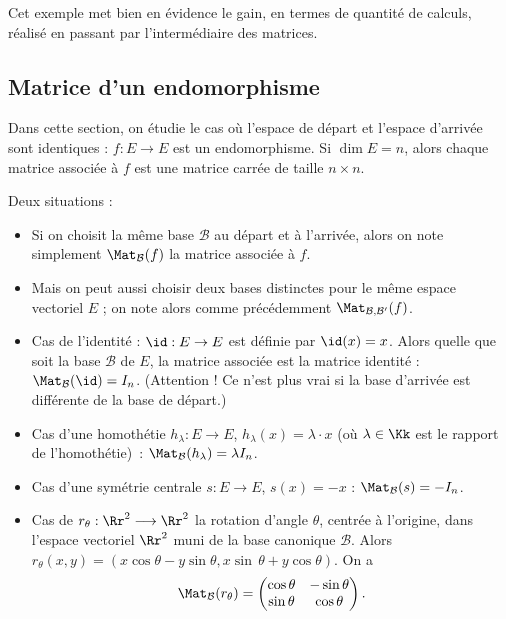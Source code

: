 \documentclass[class=report,crop=false]{standalone}
\begin{document}
\begin{exemple}
\begin{enumerate}
\end{enumerate}
Cet exemple met bien en évidence le gain, en termes de quantité de
calculs, réalisé en passant par l'intermédiaire des matrices.
\end{exemple}


\subsection{Matrice d'un endomorphisme}

Dans cette section, on étudie le cas où l'espace de départ et l'espace d'arrivée sont identiques :
$f : E \to E$ est un endomorphisme. Si $\dim E = n$, alors chaque matrice associée à $f$ est
une matrice carrée de taille $n\times n$.

Deux situations :
\begin{itemize}
  \item Si on choisit la même base $\mathcal{B}$ au départ et à l'arrivée, alors on note
  simplement $\Mat_{\mathcal{B}} (f)$ la matrice associée à $f$.

  \item Mais on peut aussi choisir deux bases distinctes pour le même espace vectoriel $E$ ; on note alors comme précédemment
  $\Mat_{\mathcal{B},\mathcal{B}'} (f)$.
\end{itemize}


\begin{exemple}
\sauteligne
\begin{itemize}
  \item Cas de l'identité : $\id : E \to E$ est définie par $\id(x)=x$.
  Alors quelle que soit la base $\mathcal{B}$ de $E$, la matrice associée est la matrice identité :
  $\Mat_{\mathcal{B}} (\id) = I_n$. (Attention ! Ce n'est plus vrai
  si la base d'arrivée est différente de la base de départ.)

  \item Cas d'une homothétie $h_\lambda : E \to E$, $h_\lambda(x) = \lambda \cdot x$
  (où $\lambda \in \Kk$ est le rapport de l'homothétie)~:
  $\Mat_{\mathcal{B}} (h_\lambda) = \lambda I_n$.

  \item Cas d'une symétrie centrale $s : E \to E$, $s(x) = - x$ :
  $\Mat_{\mathcal{B}} (s) = - I_n$.

  \item Cas de $r_\theta : \Rr^2 \longrightarrow \Rr^2$ la rotation d'angle $\theta$,
  centrée à l'origine, dans l'espace vectoriel $\Rr^2$ muni de la base canonique $\mathcal{B}$.
  Alors $r_\theta (x,y) = (x \cos  \theta - y \sin\theta,x\sin \, \theta + y \cos\theta)$.
  On a $$\Mat_{\mathcal{B}} (r_\theta) =
  \begin{pmatrix}
\cos\theta & -\sin\theta\\
\sin\theta & \cos\theta
\end{pmatrix}.$$

\end{itemize}

\end{exemple}
\end{document}
